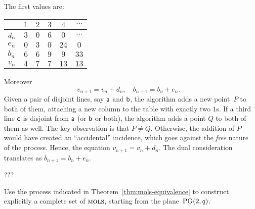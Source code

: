 \begin{solution}
    The first values are:
    \begin{center}
        \begin{tabular}{l|ccccc}
             &$1$&$2$&$3$&$4$&$\cdots$\\
             \hline
             $d_n\rule{0pt}{10pt}$&$3$&$0$&$6$&$0$&$\cdots$\\
             $e_n$&$0$&$3$&$0$&$24$&$0$\\
             $b_n$&$6$&$6$&$9$&$9$&$33$\\
             $v_n$&$4$&$7$&$7$&$13$&$13$
        \end{tabular}
    \end{center}
    Moreover
    $$
        v_{n+1}=v_n+d_n,\quad b_{n+1}=b_n+e_n.
    $$
    Given a pair of disjoint lines, say $\mathsf a$ and $\mathsf b$, the algorithm adds a new point~$P$ to both of them, attaching a new column to the table with exactly two $1$s. If a third line $\mathsf c$ is disjoint from $\mathsf a$ (or $\mathsf b$ or both), the algorithm adds a point $Q$ to both of them as well. The key observation is that $P\ne Q$. Otherwise, the addition of $P$ would have created an ``accidental'' incidence, which goes against the \textit{free} nature of the process. Hence, the equation $v_{n+1}=v_n+d_n$. The dual consideration translates as $b_{n+1}=b_n+e_n$.

    ???

\end{solution}

\begin{exr}
    Use the process indicated in\/ {\upshape Theorem~\ref{thm:mols-equivalence}} to construct explicitly a complete set of\/ $\operatorname{\textsc{mols}}$, starting from the plane\/~$\operatorname{PG}(2,q)$.
\end{exr}

